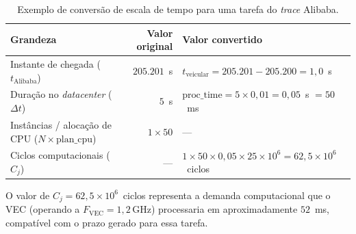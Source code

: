 \begin{table}[htb!]
\centering
\caption{Exemplo de conversão de escala de tempo para uma tarefa do \textit{trace} Alibaba.}
\label{tab:exemplo-conversao}
\begin{tabular}{p{4.5cm} r l}
\toprule
\textbf{Grandeza} & \textbf{Valor original} & \textbf{Valor convertido} \\
\midrule
Instante de chegada ($t_{\text{Alibaba}}$)                        & $205{.}201$~s  & $t_{\text{veicular}} = 205{.}201 - 205{.}200 = 1{,}0$~s \\
Duração no \textit{datacenter} ($\Delta t$)                       & $5$~s          & $\text{proc\_time} = 5 \times 0{,}01 = 0{,}05$~s $= 50$~ms \\
Instâncias / alocação \newline de \gls{CPU} ($N \times \text{plan\_cpu}$) & $1 \times 50$  & --- \\
Ciclos computacionais ($C_j$)                                     & ---            & $1 \times 50 \times 0{,}05 \times 25 \times 10^6 = 62{,}5 \times 10^6$~ciclos \\
\bottomrule
\end{tabular}
\end{table}

O valor de $C_j = 62{,}5 \times 10^6$~ciclos representa a demanda computacional que o \gls{VEC} (operando a $F_{\text{VEC}} = 1{,}2\,\text{GHz}$) processaria em aproximadamente $52$~ms, compatível com o prazo gerado para essa tarefa.
